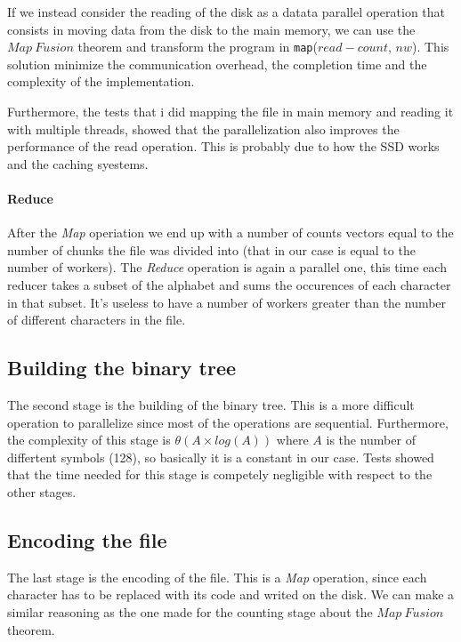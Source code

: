 \documentclass[12pt, letterpaper]{article}
\begin{document}
If we instead consider the reading of the disk as a datata parallel operation that consists in moving data from the disk to the main memory, we can use the $Map\ Fusion$ theorem and transform the program in \texttt{map}($read-count$, $nw$). This solution minimize the communication overhead, the completion time and the complexity of the implementation.


Furthermore, the tests that i did mapping the file in main memory and reading it with multiple threads, showed that the parallelization
also improves the performance of the read operation. This is probably due to how the SSD works and the caching syestems. 

\paragraph*{Reduce}
After the \textit{Map} operiation we end up with a number of counts vectors equal to the number of chunks the file was divided into (that in our case is equal to the number of workers). The \textit{Reduce} operation is again a parallel one, this time each reducer takes a subset of the alphabet and sums the occurences of each character in that subset. It's useless to have a number of workers greater than the number of different characters in the file.

\subsection{Building the binary tree}
The second stage is the building of the binary tree. This is a more difficult operation to parallelize since 
most of the operations are sequential. Furthermore, the complexity of this stage is $\theta(A \times log (A))$  where 
$A$ is the number of differtent symbols (128), so basically it is a constant in our case. Tests showed that the time needed for this stage is competely negligible with respect to the other stages.

\subsection{Encoding the file}
The last stage is the encoding of the file. This is a \textit{Map} operation, since each character has to be replaced with its code and writed on the disk. We can make a similar reasoning as the one made for the counting stage about the $Map\ Fusion$ theorem.
\end{document}
